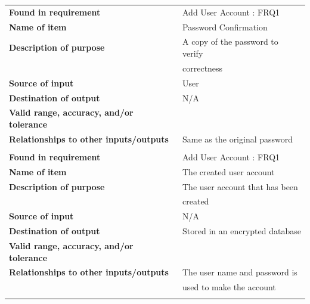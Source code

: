 \begin{tabular}{ll}
\textbf{Found in requirement}&Add User Account : FRQ1\\
\textbf{Name of item}&Password Confirmation\\
\textbf{Description of purpose}&A copy of the password to verify \\&correctness\\
\textbf{Source of input}&User\\
\textbf{Destination of output}&N/A\\
\textbf{Valid range, accuracy, and/or tolerance}&\\
\textbf{Relationships to other inputs/outputs}&Same as the original password\\
&\\
\textbf{Found in requirement}&Add User Account : FRQ1\\
\textbf{Name of item}&The created user account\\
\textbf{Description of purpose}&The user account that has been\\& created\\
\textbf{Source of input}&N/A\\
\textbf{Destination of output}&Stored in an encrypted database\\
\textbf{Valid range, accuracy, and/or tolerance}&\\
\textbf{Relationships to other inputs/outputs}&The user name and password is\\& used to make the account\\
&\\
\end{tabular}
\newpage
